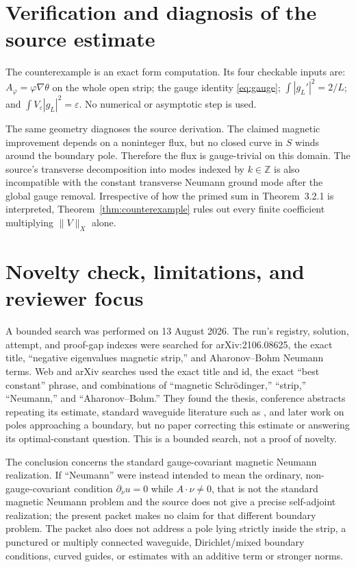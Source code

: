 \documentclass[11pt]{article}
\begin{document}
\section{Verification and diagnosis of the source estimate}

The counterexample is an exact form computation.  Its four checkable inputs
are: $A_\varphi=\varphi\nabla\theta$ on the whole open strip; the gauge identity
\eqref{eq:gauge}; $\int|g_L'|^2=2/L$; and
$\int V_\varepsilon|g_L|^2=\varepsilon$.  No numerical or asymptotic step is
used.

The same geometry diagnoses the source derivation.  The claimed magnetic
improvement depends on a noninteger flux, but no closed curve in $S$ winds
around the boundary pole.  Therefore the flux is gauge-trivial on this
domain.  The source's transverse decomposition into modes indexed by
$k\in\mathbb Z$ is also incompatible with the constant transverse Neumann
ground mode after the global gauge removal.  Irrespective of how the primed
sum in Theorem~3.2.1 is interpreted, Theorem~\ref{thm:counterexample} rules out
every finite coefficient multiplying $\lVert V\rVert_X$ alone.

\section{Novelty check, limitations, and reviewer focus}

A bounded search was performed on 13 August 2026.  The run's registry,
solution, attempt, and proof-gap indexes were searched for arXiv:2106.08625,
the exact title, ``negative eigenvalues magnetic strip,'' and Aharonov--Bohm
Neumann terms.  Web and arXiv searches used the exact title and id, the exact
``best constant'' phrase, and combinations of ``magnetic Schrödinger,''
``strip,'' ``Neumann,'' and ``Aharonov--Bohm.''  They found the thesis,
conference abstracts repeating its estimate, standard waveguide literature
such as \cite{BEK}, and later work on poles approaching a boundary, but no
paper correcting this estimate or answering its optimal-constant question.
This is a bounded search, not a proof of novelty.

The conclusion concerns the standard gauge-covariant magnetic Neumann
realization.  If ``Neumann'' were instead intended to mean the ordinary,
non-gauge-covariant condition $\partial_\nu u=0$ while $A\cdot\nu\ne0$, that is
not the standard magnetic Neumann problem and the source does not give a
precise self-adjoint realization; the present packet makes no claim for that
different boundary problem.  The packet also does not address a pole lying
strictly inside the strip, a punctured or multiply connected waveguide,
Dirichlet/mixed boundary conditions, curved guides, or estimates with an
additive term or stronger norms.
\end{document}
